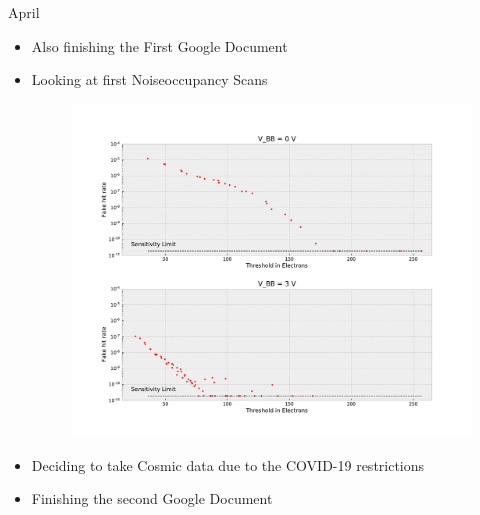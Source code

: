 \documentclass{beamer}
\begin{document}
\begin{frame}{April}
    \begin{itemize}
	\item Also finishing the First Google Document
	\item Looking at first Noiseoccupancy Scans
	    \begin{figure}[H]
		\centering
		\includegraphics[width=.5\textwidth]{MauriceFirstNoise.pdf}
	    \end{figure}
	\item Deciding to take Cosmic data due to the COVID-19 restrictions
	\item Finishing the second Google Document
    \end{itemize}
\end{frame}
\end{document}
